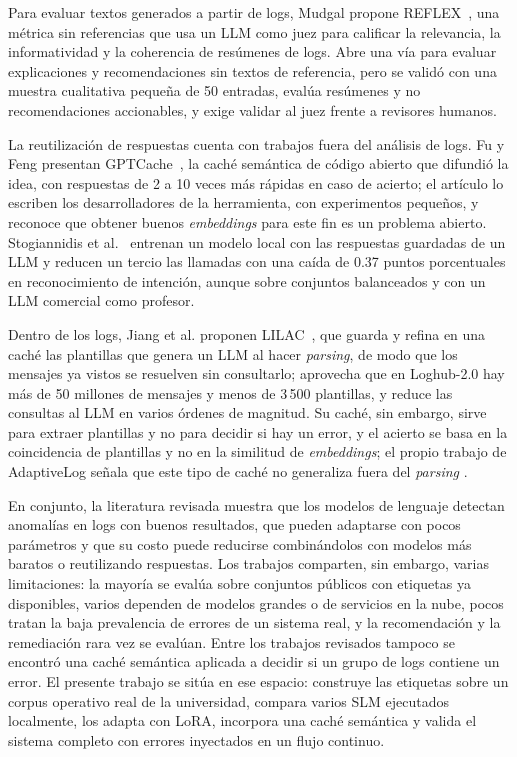 Para evaluar textos generados a partir de logs, Mudgal propone REFLEX~\cite{mudgal2025_reflex}, una métrica sin referencias que usa un LLM como juez para calificar la relevancia, la informatividad y la coherencia de resúmenes de logs. Abre una vía para evaluar explicaciones y recomendaciones sin textos de referencia, pero se validó con una muestra cualitativa pequeña de 50 entradas, evalúa resúmenes y no recomendaciones accionables, y exige validar al juez frente a revisores humanos.

La reutilización de respuestas cuenta con trabajos fuera del análisis de logs. Fu y Feng presentan GPTCache~\cite{fu2023_gptcache}, la caché semántica de código abierto que difundió la idea, con respuestas de 2 a 10 veces más rápidas en caso de acierto; el artículo lo escriben los desarrolladores de la herramienta, con experimentos pequeños, y reconoce que obtener buenos \textit{embeddings} para este fin es un problema abierto. Stogiannidis et al.~\cite{stogiannidis2023_cache} entrenan un modelo local con las respuestas guardadas de un LLM y reducen un tercio las llamadas con una caída de 0.37 puntos porcentuales en reconocimiento de intención, aunque sobre conjuntos balanceados y con un LLM comercial como profesor.

Dentro de los logs, Jiang et al. proponen LILAC~\cite{jiang2024_lilac}, que guarda y refina en una caché las plantillas que genera un LLM al hacer \textit{parsing}, de modo que los mensajes ya vistos se resuelven sin consultarlo; aprovecha que en Loghub-2.0 hay más de 50 millones de mensajes y menos de 3\,500 plantillas, y reduce las consultas al LLM en varios órdenes de magnitud. Su caché, sin embargo, sirve para extraer plantillas y no para decidir si hay un error, y el acierto se basa en la coincidencia de plantillas y no en la similitud de \textit{embeddings}; el propio trabajo de AdaptiveLog señala que este tipo de caché no generaliza fuera del \textit{parsing} \cite{ma2026_adaptivelog}.

En conjunto, la literatura revisada muestra que los modelos de lenguaje detectan anomalías en logs con buenos resultados, que pueden adaptarse con pocos parámetros y que su costo puede reducirse combinándolos con modelos más baratos o reutilizando respuestas. Los trabajos comparten, sin embargo, varias limitaciones: la mayoría se evalúa sobre conjuntos públicos con etiquetas ya disponibles, varios dependen de modelos grandes o de servicios en la nube, pocos tratan la baja prevalencia de errores de un sistema real, y la recomendación y la remediación rara vez se evalúan. Entre los trabajos revisados tampoco se encontró una caché semántica aplicada a decidir si un grupo de logs contiene un error. El presente trabajo se sitúa en ese espacio: construye las etiquetas sobre un corpus operativo real de la universidad, compara varios SLM ejecutados localmente, los adapta con LoRA, incorpora una caché semántica y valida el sistema completo con errores inyectados en un flujo continuo.
